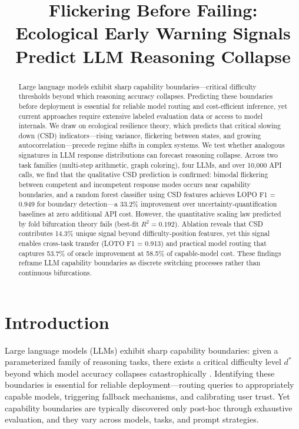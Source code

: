 \documentclass[11pt,letterpaper]{article}
\title{Flickering Before Failing: Ecological Early Warning Signals Predict LLM Reasoning Collapse}
\author{}
\date{}
\begin{document}
\maketitle

\begin{abstract}
Large language models exhibit sharp capability boundaries---critical difficulty thresholds beyond which reasoning accuracy collapses. Predicting these boundaries before deployment is essential for reliable model routing and cost-efficient inference, yet current approaches require extensive labeled evaluation data or access to model internals. We draw on ecological resilience theory, which predicts that critical slowing down (CSD) indicators---rising variance, flickering between states, and growing autocorrelation---precede regime shifts in complex systems. We test whether analogous signatures in LLM response distributions can forecast reasoning collapse. Across two task families (multi-step arithmetic, graph coloring), four LLMs, and over 10,000 API calls, we find that the qualitative CSD prediction is confirmed: bimodal flickering between competent and incompetent response modes occurs near capability boundaries, and a random forest classifier using CSD features achieves LOPO F1 = 0.949 for boundary detection---a 33.2\% improvement over uncertainty-quantification baselines at zero additional API cost. However, the quantitative scaling law predicted by fold bifurcation theory fails (best-fit $R^2 = 0.192$). Ablation reveals that CSD contributes 14.3\% unique signal beyond difficulty-position features, yet this signal enables cross-task transfer (LOTO F1 = 0.913) and practical model routing that captures 53.7\% of oracle improvement at 58.5\% of capable-model cost. These findings reframe LLM capability boundaries as discrete switching processes rather than continuous bifurcations.
\end{abstract}

\section{Introduction}

Large language models (LLMs) exhibit sharp capability boundaries: given a parameterized family of reasoning tasks, there exists a critical difficulty level $d^*$ beyond which model accuracy collapses catastrophically \citep{Wei2022, Kaplan2020}. Identifying these boundaries is essential for reliable deployment---routing queries to appropriately capable models, triggering fallback mechanisms, and calibrating user trust. Yet capability boundaries are typically discovered only post-hoc through exhaustive evaluation, and they vary across models, tasks, and prompt strategies.
\end{document}
